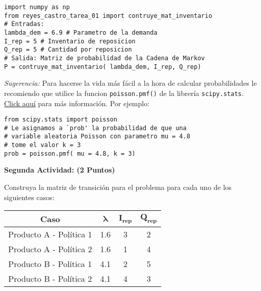 \documentclass[ a4paper, twoside, 11pt]{article}
\begin{document}
\begin{problem}
\begin{center}
\begin{minipage}{0.9\textwidth}
\begin{verbatim}
import numpy as np
from reyes_castro_tarea_01 import contruye_mat_inventario
# Entradas:
lambda_dem = 6.9 # Parametro de la demanda
I_rep = 5 # Inventario de reposicion
Q_rep = 5 # Cantidad por reposicion
# Salida: Matriz de probabilidad de la Cadena de Markov
P = contruye_mat_inventario( lambda_dem, I_rep, Q_rep)
\end{verbatim}
\end{minipage}
\end{center}
\fullskip

\emph{Sugerencia:} Para hacerse la vida m\'as f\'acil a la hora de calcular probabilidades le recomiendo que utilice la funcion {\tt poisson.pmf()} de la librer\'ia {\tt scipy.stats}. \href{https://docs.scipy.org/doc/scipy/reference/generated/scipy.stats.poisson.html}{Click aqu\'i} para m\'as informaci\'on. Por ejemplo: 
\halfskip

\begin{center}
\begin{minipage}{0.9\textwidth}
\begin{verbatim}
from scipy.stats import poisson
# Le asignamos a `prob' la probabilidad de que una 
# variable aleatoria Poisson con parametro mu = 4.8 
# tome el valor k = 3
prob = poisson.pmf( mu = 4.8, k = 3)
\end{verbatim}
\end{minipage}
\end{center}
\fullskip

\textbf{Segunda Actividad: (2 Puntos)}

Construya la matriz de transici\'on para el problema para cada uno de los siguientes casos: 
\begin{table}[htb]
\centering
\begin{tabular}{|c|c|c|c|}
\hline
\textbf{Caso}           & $\bm{\lambda}$ & $\bm{I_{rep}}$ & $\bm{Q_{rep}}$ \\ \hline
Producto A - Pol\'itica 1 & 1.6                & 3                  & 2                  \\ \hline
Producto A - Pol\'itica 2 & 1.6                & 1                  & 4                  \\ \hline
Producto B - Pol\'itica 1 & 4.1                & 2                  & 5                  \\ \hline
Producto B - Pol\'itica 2 & 4.1                & 4                  & 3                  \\ \hline
\end{tabular}
\end{table}


\end{problem}
\end{document}
